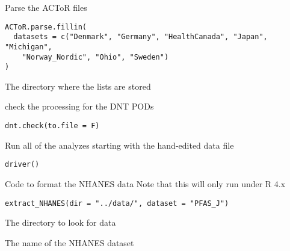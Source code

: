 \documentclass[letterpaper]{book}
\begin{document}
%
\begin{Description}\relax
Parse the ACToR files
\end{Description}
%
\begin{Usage}
\begin{verbatim}
ACToR.parse.fillin(
  datasets = c("Denmark", "Germany", "HealthCanada", "Japan", "Michigan",
    "Norway_Nordic", "Ohio", "Sweden")
)
\end{verbatim}
\end{Usage}
%
\begin{Arguments}
\begin{ldescription}
\item[\code{dir}] The directory where the lists are stored
\end{ldescription}
\end{Arguments}
%
\begin{Description}\relax
check the processing for the DNT PODs
\end{Description}
%
\begin{Usage}
\begin{verbatim}
dnt.check(to.file = F)
\end{verbatim}
\end{Usage}
%
\begin{Description}\relax
Run all of the analyzes starting with the hand-edited data file
\end{Description}
%
\begin{Usage}
\begin{verbatim}
driver()
\end{verbatim}
\end{Usage}
%
\begin{Description}\relax
Code to format the NHANES data
Note that this will only run under R 4.x
\end{Description}
%
\begin{Usage}
\begin{verbatim}
extract_NHANES(dir = "../data/", dataset = "PFAS_J")
\end{verbatim}
\end{Usage}
%
\begin{Arguments}
\begin{ldescription}
\item[\code{dir}] The directory to look for data

\item[\code{dataset}] The name of the NHANES dataset
\end{ldescription}
\end{Arguments}
\end{document}
